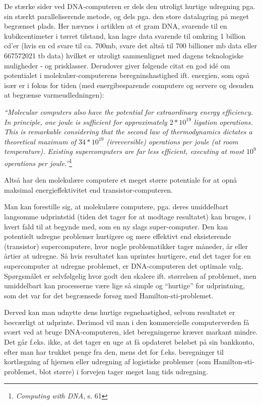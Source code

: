 \documentclass[10pt,a4paper]{article}
\newcommand{\citat}[2]{\begin{justify}\textit{``#1''}\hspace{0.1cm}\footnote{#2}\end{justify}}
\begin{document}
De stærke sider ved DNA-computeren er dels den utroligt hurtige udregning pga. 
sin stærkt paralleliserende metode, og dels pga. den store datalagring på meget 
begrænset plads. Her nævnes i artiklen at et gram DNA, svarende til en 
kubikcentimeter i tørret tilstand, kan lagre data svarende til omkring 1
billion cd'er (hvis en cd svare til ca. 700mb, svare det altså til 700 billioner
mb data eller 667572021 tb data) hvilket er utroligt sammenlignet med dagens
teknologiske muligheder - og prisklasser. Derudover giver følgende citat en god 
idé om potentialet i molekulær-computerens beregninshastighed ift. energien, 
som også især er i fokus for tiden (med energibesparende computere og servere 
og desuden at begrænse varmeudledningen):
\citat{Molecular computers also have the potential for extraordinary energy 
efficiency. In principle, one joule is sufficient for approximately $2*10^{19}$ 
ligation operations. This is remarkable considering that the second law of 
thermodynamics dictates a theoretical maximum of $34*10^{19}$ (irreversible) 
operations per joule (at room temperature). Existing supercomputers are far
less efficient, executing at most $10^{9}$ operations per
joule.}{\textit{Computing with DNA}, s. 61}
Altså har den molekulære computere et meget større potentiale for at opnå 
maksimal energieffektivitet end transistor-computeren.

Man kan forestille sig, at molekulære computere, pga. deres umiddelbart 
langsomme udprintstid (tiden det tager for at modtage resultatet) kan bruges, i 
hvert fald til at begynde med, som en ny slags super-computer. Den kan 
potentielt udregne problemer hurtigere og mere effektivt end eksisterende
(transistor) supercomputere, hvor nogle problematikker tager måneder, år eller
årtier at udregne. Så hvis resultatet kan uprintes hurtigere, end det tager for
en supercomputer at udregne problemet, er DNA-computeren det optimale valg.
Spørgsmålet er selvfølgelig hvor godt den skalere ift. størrelsen af problemet,
men umiddelbart kan processerne være lige så simple og ``hurtige'' for
udprintning, som det var for det begrænsede forsøg med Hamilton-sti-problemet.

Derved kan man udnytte dens hurtige regnehastighed, selvom resultatet er
besværligt at udprinte. Derimod vil man i den kommercielle computerverden få
svært ved at bruge DNA-computeren, idet beregningerne kræver markant mindre. Det
går f.eks. ikke, at det tager en uge at få opdateret beløbet på sin bankkonto,
efter man har trukket penge fra den, mens det for f.eks. beregninger til
kortlægning af hjernen eller udregning af logistiske problemer (som
Hamilton-sti-problemet, blot større) i forvejen tager meget lang tids udregning.
\end{document}
